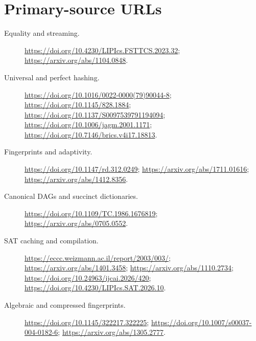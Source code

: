 \documentclass[11pt]{article}
\begin{document}
\section*{Primary-source URLs}

\begin{description}
\item[Equality and streaming.] \url{https://doi.org/10.4230/LIPIcs.FSTTCS.2023.32};
\url{https://arxiv.org/abs/1104.0848}.

\item[Universal and perfect hashing.] 
\url{https://doi.org/10.1016/0022-0000(79)90044-8};
\url{https://doi.org/10.1145/828.1884};
\url{https://doi.org/10.1137/S0097539791194094};
\url{https://doi.org/10.1006/jagm.2001.1171};
\url{https://doi.org/10.7146/brics.v4i17.18813}.

\item[Fingerprints and adaptivity.] 
\url{https://doi.org/10.1147/rd.312.0249};
\url{https://arxiv.org/abs/1711.01616};
\url{https://arxiv.org/abs/1412.8356}.

\item[Canonical DAGs and succinct dictionaries.]
\url{https://doi.org/10.1109/TC.1986.1676819};
\url{https://arxiv.org/abs/0705.0552}.

\item[SAT caching and compilation.]
\url{https://eccc.weizmann.ac.il/report/2003/003/};
\url{https://arxiv.org/abs/1401.3458};
\url{https://arxiv.org/abs/1110.2734};
\url{https://doi.org/10.24963/ijcai.2026/420};
\url{https://doi.org/10.4230/LIPIcs.SAT.2026.10}.

\item[Algebraic and compressed fingerprints.]
\url{https://doi.org/10.1145/322217.322225};
\url{https://doi.org/10.1007/s00037-004-0182-6};
\url{https://arxiv.org/abs/1305.2777}.
\end{description}
\end{document}
